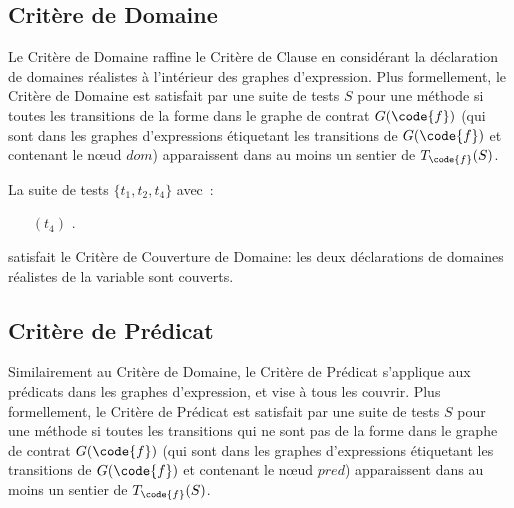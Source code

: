 \subsection{Critère de Domaine}

Le Critère de Domaine raffine le Critère de Clause en considérant la déclaration
de domaines réalistes à l'intérieur des graphes d'expression. Plus formellement,
le Critère de Domaine est satisfait par une suite de tests $S$ pour une méthode
 si toutes les transitions de la forme  dans le graphe de
contrat $G(\code{f})$ (qui sont dans les graphes d'expressions étiquetant les
transitions de $G(\code{f})$ et contenant le nœud $\mathit{dom}$) apparaissent
dans au moins un sentier de $T_\code{f}(S)$.

\begin{example}

La suite de tests $\{t_1, t_2, t_4\}$ avec~:
%
\begin{itemize}

\item[$(t_4)$] .

\end{itemize}
%
satisfait le Critère de Couverture de Domaine: les deux déclarations de domaines
réalistes de la variable  sont couverts.

\end{example}

\subsection{Critère de Prédicat}

Similairement au Critère de Domaine, le Critère de Prédicat s'applique aux
prédicats dans les graphes d'expression, et vise à tous les couvrir. Plus
formellement, le Critère de Prédicat est satisfait par une suite de tests $S$
pour une méthode  si toutes les transitions qui ne sont pas de la forme
 dans le graphe de contrat $G(\code{f})$ (qui sont dans les
graphes d'expressions étiquetant les transitions de $G(\code{f})$ et contenant
le nœud $\mathit{pred}$) apparaissent dans au moins un sentier de
$T_\code{f}(S)$.

